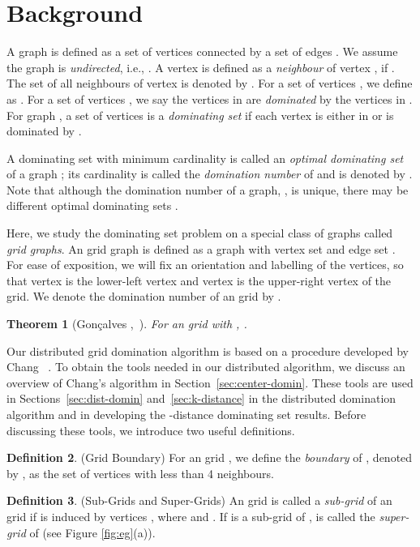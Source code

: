\documentclass[letterpaper, 10pt, conference]{ieeeconf}
\newtheorem{theorem}{Theorem}[section]
\theoremstyle{definition}
\newtheorem{definition}[theorem]{Definition}
\theoremstyle{remark}
\begin{document}
\section{Background}
\label{sec:background}
A graph  is defined as a set of vertices  connected by a set of edges . We assume the graph is \emph{undirected}, i.e., . A vertex  is defined as a \emph{neighbour} of vertex , if . The set of all neighbours of vertex  is denoted by . For a set of vertices , we define  as . For a set of vertices , we say the vertices in  are \emph{dominated} by the vertices in . For graph , a set of vertices  is a \emph{dominating set} if each vertex  is either in  or is dominated by .


A dominating set with minimum cardinality is called an \emph{optimal dominating set} of a graph ; its cardinality is called the \emph{domination number} of  and is denoted by . Note that although the domination number of a graph, , is unique, there may be different optimal dominating sets \cite{CLRS'01}.

Here, we study the dominating set problem on a special class of graphs called \emph{grid graphs}. An  grid graph  is defined as a graph with vertex set  and edge set  \cite{BM'08}. For ease of exposition, we will fix an orientation and labelling of the vertices, so that vertex  is the lower-left vertex and vertex  is the upper-right vertex of the grid.
We denote the domination number of an  grid  by .


\begin{theorem}[Gon\c{c}alves ,~\cite{GPRT'11}]
\label{theo:cited-4}
For an  grid with , .
\end{theorem}


Our distributed grid domination algorithm is based on a procedure developed by Chang ~\cite{TYC'92}. To obtain the tools needed in our distributed algorithm, we discuss an overview of Chang's algorithm in Section~\ref{sec:center-domin}. These tools are used in Sections~\ref{sec:dist-domin} and~\ref{sec:k-distance} in the distributed domination algorithm and in developing the -distance dominating set results. Before discussing these tools, we introduce two useful definitions.


\begin{definition}(Grid Boundary)
\label{def:boundaries}
For an  grid , we define the \emph{boundary} of , denoted by , as the set of vertices with less than 4 neighbours.
\end{definition}

\begin{definition}(Sub-Grids and Super-Grids)
\label{def:sub-super-grids}
An  grid  is called a \emph{sub-grid} of an  grid  if  is induced by vertices , where  and . If  is a sub-grid of ,  is called the \emph{super-grid} of  (see Figure \ref{fig:eg}(a)).
\end{definition}
\end{document}
